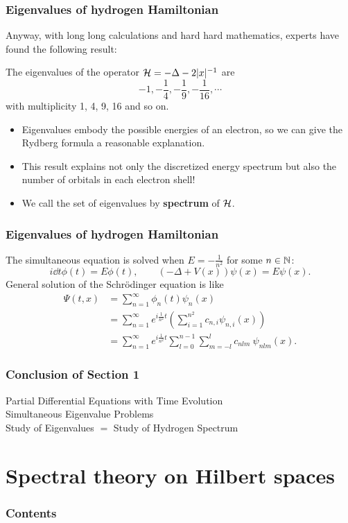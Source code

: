\documentclass[10pt]{beamer}
\begin{document}
\begin{frame}
\frametitle{Eigenvalues of hydrogen Hamiltonian}
  Anyway, with long long calculations and hard hard mathematics, experts have found the following result:
  \begin{prop}
    The eigenvalues of the operator $\mathcal{H}=-\Delta-2|x|^{-1}$ are \pause
    \[-1,-\frac14,-\frac19,-\frac1{16},\cdots\]
    \pause with multiplicity 1, 4, 9, 16 and so on.
  \end{prop}
  \begin{itemize}[<+->]
    \item Eigenvalues embody the possible energies of an electron, so we can give the Rydberg formula a reasonable explanation.
    \item This result explains not only the discretized energy spectrum but also the number of orbitals in each electron shell!
    \item We call the set of eigenvalues by \textbf{spectrum} of $\mathcal{H}$.
  \end{itemize}
\end{frame}

\begin{frame}
\frametitle{Eigenvalues of hydrogen Hamiltonian}
  The simultaneous equation is solved when $E=-\frac1{n^2}$ for some $n\in\mathbb{N}$:
  \[i\dd{t}\phi(t)=E\phi(t),\qquad(-\Delta+V(x))\psi(x)=E\psi(x).\]
  \pause General solution of the Schr\"odinger equation is like
  \begin{align*}
    \Psi(t,x)&=\sum_{n=1}^\infty\phi_n(t)\psi_n(x)\\
    &=\sum_{n=1}^\infty e^{i\frac1{n^2}t}\left(\sum_{i=1}^{n^2}c_{n,i}\psi_{n,i}(x)\right)\\
    &=\sum_{n=1}^\infty e^{i\frac1{n^2}t}\sum_{l=0}^{n-1}\sum_{m=-l}^lc_{nlm}\ \psi_{nlm}(x).
  \end{align*}
\end{frame}

\begin{frame}
\frametitle{Conclusion of Section 1}
  \begin{rd}
  Partial Differential Equations with Time Evolution \\
  Simultaneous Eigenvalue Problems  \\
  Study of Eigenvalues $=$ Study of Hydrogen Spectrum
  \end{rd}
\end{frame}


\section{Spectral theory on Hilbert spaces}
\begin{frame}
\frametitle{Contents}
  \tableofcontents[currentsection]
\end{frame}
\end{document}
